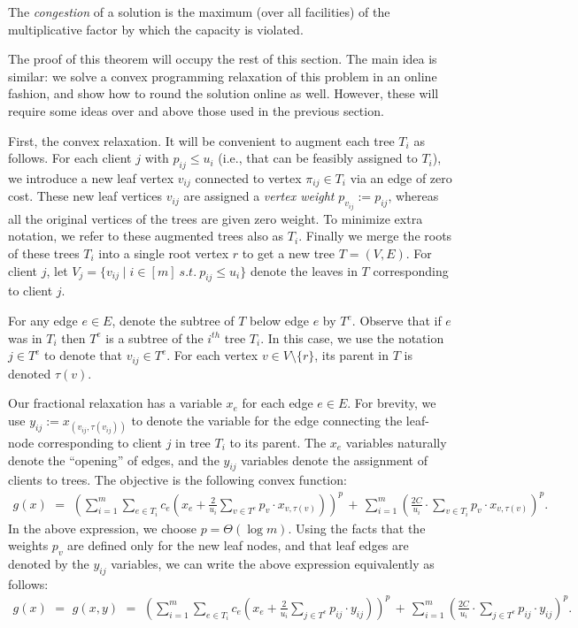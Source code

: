 \documentclass[letterpaper,11pt]{article}
\begin{document}
The \emph{congestion} of a solution is the maximum (over all
facilities) of the multiplicative factor by which the
capacity is violated.

The proof of this theorem will occupy the rest of this section. The main
idea is similar: we solve a convex programming relaxation of this
problem in an online fashion, and show how to round the solution online
as well. However, these will require some ideas over and above those
used in the previous section.

First, the convex relaxation. It will be convenient to augment each tree
$T_i$ as follows. For each client $j$ with $p_{ij}\le u_i$ (i.e., that
can be feasibly assigned to $T_i$), we introduce a new leaf vertex
$v_{ij}$ connected to vertex $\pi_{ij}\in T_i$ via an edge of zero cost.
These new leaf vertices $v_{ij}$ are assigned a \emph{vertex weight}
$p_{v_{ij}} := p_{ij}$, whereas all the original vertices of the trees
are given zero weight.  To minimize extra notation, we refer to these
augmented trees also as $T_i$. Finally we merge the roots of these trees
$T_i$ into a single root vertex $r$ to get a new tree $T = (V,E)$. For
client $j$, let $V_j = \{ v_{ij} \mid i \in [m] ~s.t.~ p_{ij}\le u_i\}$
denote the leaves in $T$ corresponding to client $j$.

For any edge $e\in E$, denote the subtree of $T$ below edge $e$ by
$T^e$. Observe that if $e$ was in $T_i$ then $T^e$ is a subtree of the
$i^{th}$ tree $T_i$. In this case, we use the notation $j \in T^e$ to
denote that $v_{ij} \in T^e$. For each vertex $v\in
V\setminus \{r\}$, its parent in $T$ is denoted $\tau(v)$.

Our fractional relaxation has a variable $x_e$ for each edge $e \in
E$. For brevity, we use $y_{ij} := x_{(v_{ij},\tau(v_{ij}))}$ to denote
the variable for the edge connecting the leaf-node corresponding to
client $j$ in tree $T_i$ to its parent. The $x_e$ variables naturally
denote the ``opening'' of edges, and the $y_{ij}$ variables denote the
assignment of clients to trees.  The objective is the following convex
function:
\begin{gather}
  g(x) \,\,=\,\, \left(\sum_{i=1}^m \sum_{e\in T_i} c_e \left( x_e +
      \frac{2}{u_i} \sum_{v\in T^e} p_{v} \cdot x_{v,\tau(v)}
    \right)\right)^p \, + \, \sum_{i=1}^{m}\left(\frac{2C}{u_i}\cdot
    \sum_{v\in T_i} p_{v} \cdot x_{v,\tau(v)}\right)^p.
\end{gather}
In the above expression, we choose $p=\Theta(\log m)$. Using the facts
that the weights $p_v$ are defined only for the new leaf nodes, and that
leaf edges are denoted by the $y_{ij}$ variables, we can write the above
expression equivalently as follows:
\begin{gather}
  g(x) \,\,=\,\, g(x,y) \,\,=\,\, \left(\sum_{i=1}^m \sum_{e\in T_i} c_e
    \left( x_e + \frac{2}{u_i} \sum_{j\in T^e} p_{ij} \cdot y_{ij}
    \right)\right)^p \, + \, \sum_{i=1}^{m}\left(\frac{2C}{u_i}\cdot
    \sum_{j\in T^e} p_{ij} \cdot y_{ij}\right)^p.
\end{gather}
\end{document}
